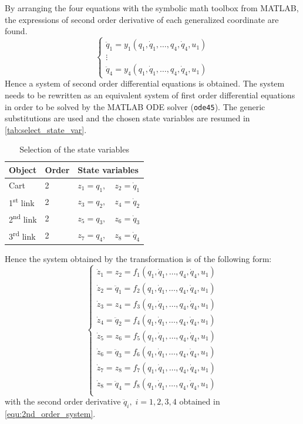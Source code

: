 \documentclass[a4paper,12pt]{article}
\begin{document}
By arranging the four equations with the symbolic math toolbox from MATLAB, the expressions of second order derivative of each generalized coordinate are found.
\begin{equation} \label{equ:2nd_order_system}
	\left\{
	\begin{array}{*{20}{c}}
	\ddot q_1 = y_1 (q_1,\dot q_1, \ldots, q_4,\dot q_4, u_1)\\
	\vdots \\
	\ddot q_4 = y_4 (q_1,\dot q_1, \ldots, q_4,\dot q_4, u_1)
	\end{array}
	\right.
\end{equation}
Hence a system of second order differential equations is obtained. The system needs to be rewritten as an equivalent system of first order differential equations in order to be solved by the MATLAB ODE solver (\texttt{ode45}). The generic substitutions are used and the chosen state variables are resumed in \autoref{tab:select_state_var}.
\begin{table}[H]
	\centering
	\caption{Selection of the state variables}
	\label{tab:select_state_var}
	\begin{tabular}{@{}lll@{}}
	\toprule
	Object                     & Order & State variables                   \\ \midrule
	Cart                       & 2     & $z_1 = q_1, \quad z_2 = \dot q_1$ \\
	1\textsuperscript{st} link & 2     & $z_3 = q_2, \quad z_4 = \dot q_2$ \\
	2\textsuperscript{nd} link & 2     & $z_5 = q_3, \quad z_6 = \dot q_3$ \\
	3\textsuperscript{rd} link & 2     & $z_7 = q_4, \quad z_8 = \dot q_4$ \\ \bottomrule
	\end{tabular}
\end{table}
Hence the system obtained by the transformation is of the following form:
\begin{equation} \label{equ:model_final}
	\left\{
	\begin{array}{*{20}{c}}
		\dot z_1 = z_2       = f_1(q_1,\dot q_1,\ldots, q_4,\dot q_4, u_1) \\
		\dot z_2 = \ddot q_1 = f_2(q_1,\dot q_1,\ldots, q_4,\dot q_4, u_1) \\
		\dot z_3 = z_4       = f_3(q_1,\dot q_1,\ldots, q_4,\dot q_4, u_1) \\
		\dot z_4 = \ddot q_2 = f_4(q_1,\dot q_1,\ldots, q_4,\dot q_4, u_1) \\
		\dot z_5 = z_6       = f_5(q_1,\dot q_1,\ldots, q_4,\dot q_4, u_1) \\
		\dot z_6 = \ddot q_3 = f_6(q_1,\dot q_1,\ldots, q_4,\dot q_4, u_1) \\
		\dot z_7 = z_8       = f_7(q_1,\dot q_1,\ldots, q_4,\dot q_4, u_1) \\
		\dot z_8 = \ddot q_4 = f_8(q_1,\dot q_1,\ldots, q_4,\dot q_4, u_1) \\
	\end{array}
	\right.
\end{equation}
with the second order derivative $\ddot q_i,\; i=1,2,3,4$ obtained in \eqref{equ:2nd_order_system}.
\end{document}
